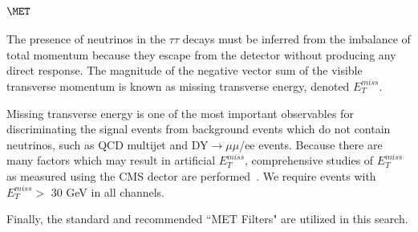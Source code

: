 \section{\texorpdfstring{$\MET$}{Missing transverse energy}}\label{ss:met}

The presence of neutrinos in the $\tau\tau$ decays must be inferred from the imbalance of total momentum because they escape from the detector without producing 
any direct response. The magnitude of the negative vector sum of the visible transverse momentum is known as missing transverse energy, denoted $E^{miss}_{T}$.

Missing transverse energy is one of the most important observables for discriminating the signal events from background events which do not contain neutrinos, 
such as QCD multijet and DY$\to\mu\mu$/ee events.
Because there are many factors which may result in artificial $E^{miss}_{T}$, comprehensive studies of $E^{miss}_{T}$ as measured using the CMS dector are 
performed~\cite{MET}. We require events with $E^{miss}_{T} >$ 30 GeV in all channels.

Finally, the standard and recommended ``MET Filters" are utilized in this search.
